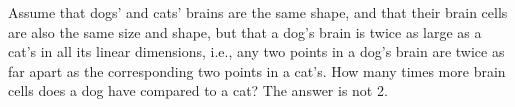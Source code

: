         Assume that dogs' and cats' brains are the same shape, and that their brain cells
        are also the same size and shape,
        but that a dog's brain is twice as large as a cat's in all its linear dimensions, i.e.,
        any two points in a dog's brain are twice as far apart as the corresponding two
        points in a cat's. How many times more brain cells does a dog have compared to a
        cat? The answer is not 2.

